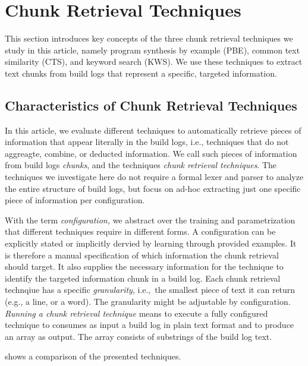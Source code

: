 
\section{Chunk Retrieval Techniques}
\label{sec:techniques}
This section introduces key concepts of the three chunk retrieval
techniques we study in this article, namely program synthesis by
example (PBE), common text similarity (CTS), and keyword search (KWS).
We use these techniques to extract text chunks from build logs that
represent a specific, targeted information.

\subsection{Characteristics of Chunk Retrieval Techniques}
\label{sec:blirt}
In this article, we evaluate different techniques to automatically
retrieve pieces of information that appear literally in the build
logs, i.e., techniques that do not aggreagte, combine, or deducted
information. We call such pieces of information from build logs
\emph{chunks}, and the techniques \emph{chunk retrieval techniques}.
The techniques we investigate here do not require a formal lexer and
parser to analyze the entire structure of build logs, but focus on
ad-hoc extracting just one specific piece of information per
configuration.

With the term \textit{configuration,} we abstract over the training
and parametrization that different techniques require in different
forms. A configuration can be explicitly stated or implicitly dervied
by learning through provided examples. It is therefore a manual
specification of which information the chunk retrieval should target.
It also supplies the necessary information for the technique to
identify the targeted information chunk in a build log. Each chunk
retrieval technqiue has a specific \textit{granularity}, i.e.,\ the
smallest piece of text it can return (e.g., a line, or a word). The
granularity might be adjustable by configuration. \emph{Running a
chunk retrieval technique} means to execute a fully configured
technique to consumes as input a build log in plain text format and to
produce an array as output. The array consists of substrings of the
build log text.

 shows a comparison of the presented techniques.

